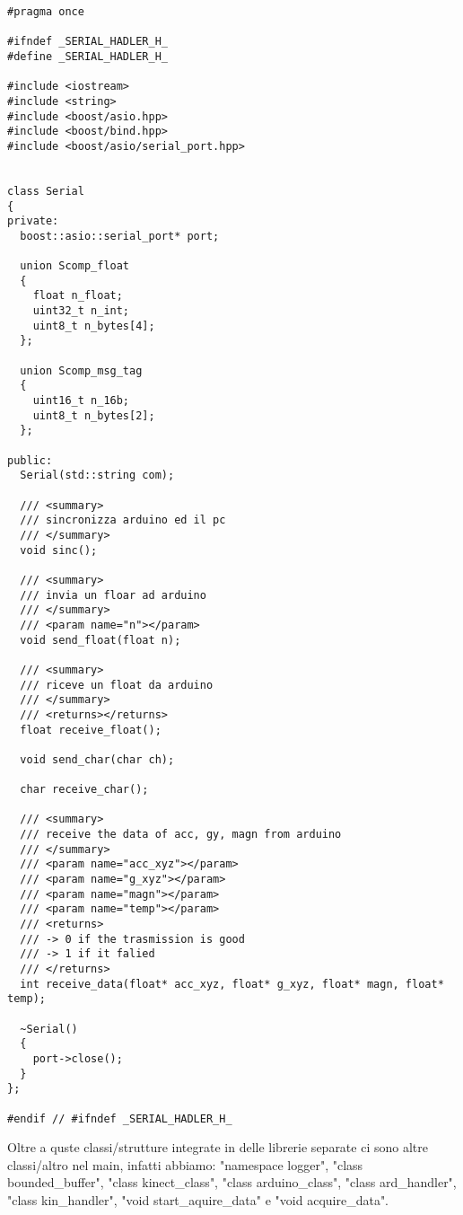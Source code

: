 \documentclass[10pt,a4paper]{article}
\begin{document}
\begin{lstlisting}[style=mycpp, caption=librerie usate, captionpos=b]
#pragma once

#ifndef _SERIAL_HADLER_H_
#define _SERIAL_HADLER_H_

#include <iostream>
#include <string>
#include <boost/asio.hpp> 
#include <boost/bind.hpp>
#include <boost/asio/serial_port.hpp> 


class Serial
{
private:
  boost::asio::serial_port* port;

  union Scomp_float
  {
    float n_float;
    uint32_t n_int;
    uint8_t n_bytes[4];
  };

  union Scomp_msg_tag
  {
    uint16_t n_16b;
    uint8_t n_bytes[2];
  };

public:
  Serial(std::string com);
  
  /// <summary>
  /// sincronizza arduino ed il pc
  /// </summary>
  void sinc();

  /// <summary>
  /// invia un floar ad arduino
  /// </summary>
  /// <param name="n"></param>
  void send_float(float n);

  /// <summary>
  /// riceve un float da arduino
  /// </summary>
  /// <returns></returns>
  float receive_float();

  void send_char(char ch);

  char receive_char();

  /// <summary>
  /// receive the data of acc, gy, magn from arduino
  /// </summary>
  /// <param name="acc_xyz"></param>
  /// <param name="g_xyz"></param>
  /// <param name="magn"></param>
  /// <param name="temp"></param>
  /// <returns>
  /// -> 0 if the trasmission is good
  /// -> 1 if it falied
  /// </returns>
  int receive_data(float* acc_xyz, float* g_xyz, float* magn, float* temp);

  ~Serial()
  {
    port->close();
  }
};

#endif // #ifndef _SERIAL_HADLER_H_
\end{lstlisting}
%
%
Oltre a quste classi/strutture integrate in delle librerie separate ci sono altre classi/altro nel main, infatti abbiamo: "namespace logger", "class bounded\_buffer", "class kinect\_class", "class arduino\_class", "class ard\_handler", "class kin\_handler", "void start\_aquire\_data" e "void acquire\_data".
%
%
\\
\end{document}
